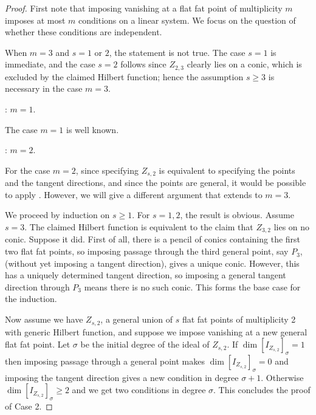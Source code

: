\documentclass[12pt]{amsart}%
\numberwithin{equation}{section}
\theoremstyle{definition}
\numberwithin{equation}{section}
\begin{document}
\begin{proof}

First note that imposing vanishing at a flat fat point of multiplicity $m$ imposes at most $m$ conditions on a linear system. We focus on the question of whether these conditions are independent.

When $m=3$ and $s=1$ or $2$, the statement is not true. The case $s=1$ is immediate, and the case $s=2$ follows since $Z_{2,3}$ clearly lies on a conic, which is excluded by the claimed Hilbert function; hence the assumption $s \geq 3$ is necessary in the case $m=3$.

\vspace{.2in}

: $m=1$.    

The case $m=1$ is well known. 

    \vspace{.2in}
    
: $m=2$.   

For the case $m=2$, since specifying $Z_{s,2}$ is equivalent to specifying the points and the tangent directions, and since the points are general, it would be possible to apply \cite[Theorem 4.1]{CG}. However, we will give a different argument that extends to $m=3$.

We proceed by induction on $s \geq 1$. For $s=1,2$, the result is obvious. Assume $s=3$. The claimed Hilbert function is equivalent to the claim that $Z_{3,2}$ lies on no conic. Suppose it did. First of all, there is a pencil of conics containing the first two flat fat points, so imposing passage through the third general point, say $P_3$, (without yet imposing a tangent direction), gives a unique conic. However, this has a uniquely determined tangent direction, so imposing a general tangent direction through $P_3$ means there is no such conic. This forms the base case for the induction.

Now assume we have $Z_{s,2}$, a general union of $s$ flat fat points of multiplicity 2 with generic Hilbert function, and suppose we impose vanishing at a new general flat fat point. 
Let $\sigma$ be the initial degree of the ideal of $Z_{s,2}$. If $\dim [I_{Z_{s,2}}]_\sigma =1$ then imposing passage through a general point makes $\dim [I_{Z_{s,2}}]_\sigma =0$ and imposing the tangent direction gives a new condition in degree $\sigma+1$. Otherwise $\dim [I_{Z_{s,2}}]_\sigma \geq 2$ and we get two conditions in degree $\sigma$. This concludes the proof of Case 2.


\end{proof}
\end{document}
